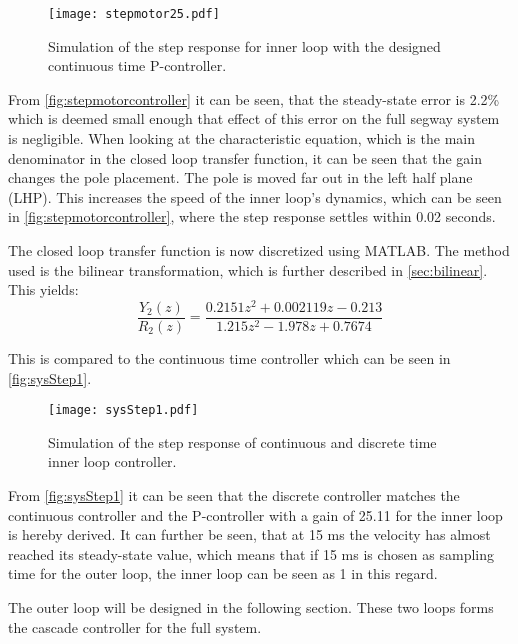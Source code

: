 \begin{figure}[H]
\centering
\texttt{[image: stepmotor25.pdf]}
\caption{Simulation of the step response for inner loop with the designed continuous time P-controller.}
\label{fig:stepmotorcontroller}
\end{figure}

From \autoref{fig:stepmotorcontroller} it can be seen, that the steady-state error is 2.2\% which is deemed small enough that effect of this error on the full segway system is negligible. When looking at the characteristic equation, which is the main denominator in the closed loop transfer function, it can be seen that the gain changes the pole placement. The pole is moved far out in the left half plane (LHP). This increases the speed of the inner loop's dynamics, which can be seen in \autoref{fig:stepmotorcontroller}, where the step response settles within 0.02 seconds. 

The closed loop transfer function is now discretized using MATLAB. The method used is the bilinear transformation, which is further described in \autoref{sec:bilinear}. This yields:
\begin{equation}
\frac{Y_2(z)}{R_2(z)} = \frac{0.2151 z^2 + 0.002119 z - 0.213}{ 1.215 z^2 - 1.978 z + 0.7674}
\end{equation}

This is compared to the continuous time controller which can be seen in \autoref{fig:sysStep1}. 

\begin{figure}[H]
\centering
\texttt{[image: sysStep1.pdf]}
\caption{Simulation of the step response of continuous and discrete time inner loop controller.}
\label{fig:sysStep1}
\end{figure}

From \autoref{fig:sysStep1} it can be seen that the discrete controller matches the continuous controller and the P-controller with a gain of 25.11 for the inner loop is hereby derived. It can further be seen, that at 15 ms the velocity has almost reached its steady-state value, which means that if 15 ms is chosen as sampling time for the outer loop, the inner loop can be seen as 1 in this regard.

The outer loop will be designed in the following section. These two loops forms the cascade controller for the full system.